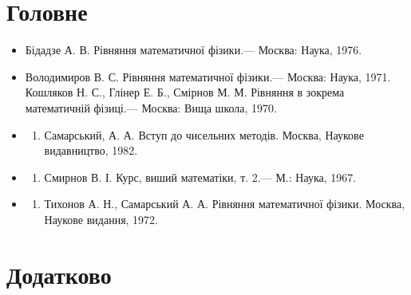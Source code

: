 \documentclass[
  ukrainian,
]{article}
\providecommand{\tightlist}{%
  \setlength{\itemsep}{0pt}\setlength{\parskip}{0pt}}
\begin{document}
\section{Головне}\label{ux433ux43eux43bux43eux432ux43dux435}

\begin{itemize}
\tightlist
\item
  Бідадзе А. В. Рівняння математичної фізики.--- Москва: Наука, 1976.
\item
  Володимиров В. С. Рівняння математичної фізики.--- Москва: Наука,
  1971. Кошляков Н. С., Глінер Е. Б., Смірнов М. М. Рівняння в зокрема
  математичній фізиці.--- Москва: Вища школа, 1970.
\item
  \begin{enumerate}
  \def\labelenumi{\arabic{enumi}.}
  \setcounter{enumi}{3}
  \tightlist
  \item
    Самарський, А. А. Вступ до чисельних методів. Москва, Наукове
    видавництво, 1982.
  \end{enumerate}
\item
  \begin{enumerate}
  \def\labelenumi{\arabic{enumi}.}
  \setcounter{enumi}{4}
  \tightlist
  \item
    Смирнов В. І. Курс, виший математіки, т. 2.--- М.: Наука, 1967.
  \end{enumerate}
\item
  \begin{enumerate}
  \def\labelenumi{\arabic{enumi}.}
  \setcounter{enumi}{5}
  \tightlist
  \item
    Тихонов А. Н., Самарський А. А. Рівняння математичної фізики.
    Москва, Наукове видання, 1972.
  \end{enumerate}
\end{itemize}

\section{Додатково}\label{ux434ux43eux434ux430ux442ux43aux43eux432ux43e}
\end{document}
